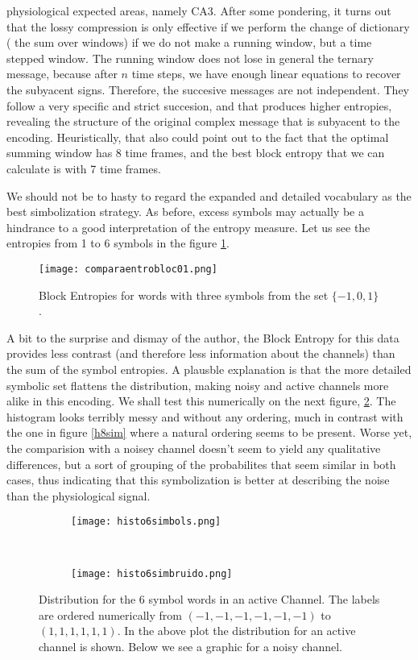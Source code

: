\documentclass[10pt]{article}
\begin{document}
physiological
expected areas, namely CA3. After some pondering, it turns out that
the lossy compression is only effective if we perform the change of dictionary
( the sum over windows) if we do not make a running window, but a time stepped
window. The running window does not lose in general the ternary message, because
after $n$ time steps, we have enough linear equations to recover the
subyacent signs. Therefore, the succesive messages are not independent. They
follow a very specific and strict succesion, and that produces higher entropies,
revealing the structure of the original complex message that is subyacent to the
encoding. Heuristically, that also could point out to the fact that
the optimal summing window has 8 time frames, and the best block entropy
that we can calculate is with 7 time frames.

We should not be to hasty to regard the expanded and detailed vocabulary
as the best simbolization strategy. As before, excess symbols may actually be a
hindrance to a good interpretation of the entropy measure. Let us see the
entropies from 1 to 6 symbols in the figure \ref{entro6symbs}.

\begin{figure}
  \texttt{[image: comparaentrobloc01.png]}
  \caption{Block Entropies for words with three symbols from the
    set $\{ -1, 0, 1 \}$. 
  }\label{entro6symbs}
\end{figure}

A bit to the surprise and dismay of the author, the Block Entropy for this
data provides less contrast (and therefore less information about the channels)
than the sum of the symbol entropies. A plausble explanation is that the
more detailed symbolic set flattens the distribution, making noisy and
active channels more alike in this encoding. We shall test this numerically
on the next figure, \ref{histo6simbols}. The histogram looks terribly
messy and without any ordering, much in contrast with the one in figure
\ref{h8sim} where a natural ordering seems to be present. Worse yet,
the comparision with a noisey channel doesn't seem to yield any qualitative
differences, but a sort of grouping of the probabilites that seem similar
in both cases, thus indicating that this symbolization is better at
describing the noise than the physiological signal.


\begin{figure}
  \centering
  \begin{subfigure}[b]{\textwidth}
  \texttt{[image: histo6simbols.png]}  
  \end{subfigure} \\
  \begin{subfigure}[b]{\textwidth}
  \texttt{[image: histo6simbruido.png]}  
  \end{subfigure} 
  \caption{Distribution for the 6 symbol words in an active
    Channel. The labels are ordered numerically from
    $(-1,-1, -1, -1,-1,-1)$ to $(1,1,1,1,1,1)$. In the above
    plot the distribution for an active channel is shown. Below we see
    a graphic for a noisy channel. 
  }\label{histo6simbols}
\end{figure}




{}

\end{document}
